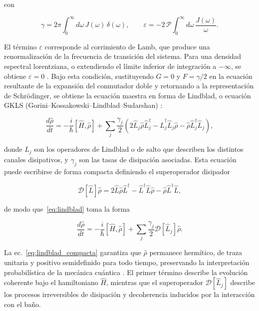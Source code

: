 con

\begin{equation}
	\gamma = 2\pi\int_0^\infty d\omega\,J(\omega)\,\delta(\omega),
	\qquad
	\varepsilon = -2\,\mathcal{P}\!\int_0^\infty d\omega\,
	\frac{J(\omega)}{\omega}.
	\label{eq:gamma_epsilon}
\end{equation}

El término $\varepsilon$ corresponde al corrimiento de Lamb, que produce una renormalización de la frecuencia de transición del sistema. Para una densidad espectral lorentziana, o extendiendo el límite inferior de integración a $-\infty$, se obtiene $\varepsilon = 0$ \cite{brasil2013}. Bajo esta condición, sustituyendo $G = 0$ y $F = \gamma/2$ en la ecuación resultante de la expansión del conmutador doble y retornando a la representación de Schrödinger, se obtiene la ecuación maestra en forma de Lindblad, o ecuación GKLS (Gorini--Kossakowski--Lindblad--Sudarshan) \cite{lindblad1976,brasil2013}:

\begin{equation}
	\frac{d\hat{\rho}}{dt} = -\frac{i}{\hbar}
	\left[\hat{H},\hat{\rho}\right]
	+ \sum_j \frac{\gamma_j}{2}\left(
	2\hat{L}_j\hat{\rho}\hat{L}_j^\dagger -
	\hat{L}_j^\dagger\hat{L}_j\hat{\rho} -
	\hat{\rho}\hat{L}_j^\dagger\hat{L}_j
	\right),
	\label{eq:lindblad}
\end{equation}

donde $\hat{L}_j$ son los operadores de Lindblad o de salto que describen los distintos canales disipativos, y $\gamma_j$ son las tasas de disipación asociadas. Esta ecuación puede escribirse de forma compacta definiendo el superoperador disipador

\begin{equation}
	\mathcal{D}[\hat{L}]\hat{\rho} = 2\hat{L}\hat{\rho}\hat{L}^\dagger
	- \hat{L}^\dagger\hat{L}\hat{\rho}
	- \hat{\rho}\hat{L}^\dagger\hat{L},
	\label{eq:disipador}
\end{equation}

de modo que~\eqref{eq:lindblad} toma la forma

\begin{equation}
	\frac{d\hat{\rho}}{dt} = -\frac{i}{\hbar}
	\left[\hat{H},\hat{\rho}\right]
	+ \sum_j \frac{\gamma_j}{2}\mathcal{D}[\hat{L}_j]\hat{\rho}.
	\label{eq:lindblad_compacta}
\end{equation}

La ec.~\eqref{eq:lindblad_compacta} garantiza que $\hat{\rho}$ permanece hermítico, de traza unitaria y positivo semidefinido para todo tiempo, preservando la interpretación probabilística de la mecánica cuántica \cite{lindblad1976}. El primer término describe la evolución coherente bajo el hamiltoniano $\hat{H}$, mientras que el superoperador $\mathcal{D}[\hat{L}_j]$ describe los procesos irreversibles de disipación y decoherencia inducidos por la interacción con el baño.

